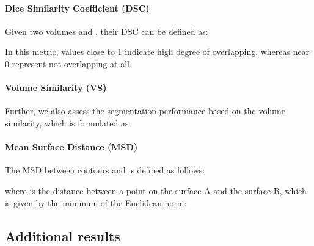\documentclass[journal]{IEEEtran}
\begin{document}
\paragraph{\textbf{Dice Similarity Coefficient (DSC)}}
Given two volumes  and , their DSC can be defined as:



In this metric, values close to 1 indicate high degree of overlapping, whereas near 0 represent not overlapping at all. 
\paragraph{\textbf{Volume Similarity (VS)}} Further, we also assess the segmentation performance based on the volume similarity, which is formulated as:



\paragraph{\textbf{Mean Surface Distance (MSD)}} The MSD between contours  and  is defined as follows:




where  is the distance between a point  on the surface A and the surface B, which is given by the minimum of the Euclidean norm:






\subsection*{\textbf{Additional results}}
\end{document}
